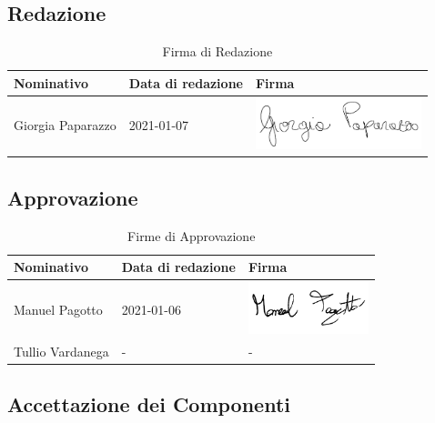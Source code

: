 \documentclass[../piano_di_progetto.tex]{subfiles}
\begin{document}
\subsection{Redazione}%
\label{sub:red}

\begin{table}[!ht]
	\centering
	\begin{tabular}{|l|l|l|}
		\hline
		\rowcolor{lightgray}
		\textbf{Nominativo} & \textbf{Data di redazione} & \textbf{Firma} \\ 
		\hline
			Giorgia Paparazzo & 2021-01-07& \includegraphics[height=1.5cm]{componenti/img/firma_gp} \\
		\hline
	\end{tabular}
	\caption{Firma di Redazione}
\end{table}


\subsection{Approvazione}%
\label{sub:app}

\begin{table}[!ht]
	\centering
	\begin{tabular}{|l|l|l|}
		\hline
		\rowcolor{lightgray}
		\textbf{Nominativo} & \textbf{Data di redazione} & \textbf{Firma} \\ 

		\hline
			Manuel Pagotto & 2021-01-06 & \includegraphics[height=1.5cm]{componenti/img/firma_mp} \\
		\hline
			Tullio Vardanega & - & - \\
		\hline
	\end{tabular}
		\caption{Firme di Approvazione}
\end{table}


\newpage
\subsection{Accettazione dei Componenti}%
\label{sub:acc_comp}
\end{document}
